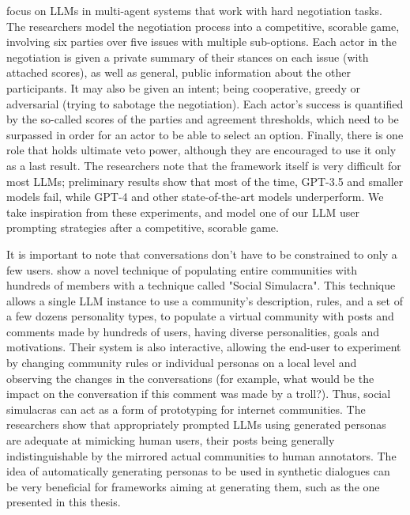 \citet{abdelnabi2024cooperationcompetitionmaliciousnessllmstakeholders} focus on LLMs in multi-agent systems that work with hard negotiation tasks. The researchers model the negotiation process into a competitive, scorable game, involving six parties over five issues with multiple sub-options. Each actor in the negotiation is given a private summary of their stances on each issue (with attached scores), as well as general, public information about the other participants. It may also be given an intent; being cooperative, greedy or adversarial (trying to sabotage the negotiation). Each actor's success is quantified by the so-called scores of the parties and agreement thresholds, which need to be surpassed in order for an actor to be able to select an option. Finally, there is one role that holds ultimate veto power, although they are encouraged to use it only as a last result. The researchers note that the framework itself is very difficult for most LLMs; preliminary results show that most of the time, GPT-3.5 and smaller models fail, while GPT-4 and other state-of-the-art models underperform. We take inspiration from these experiments, and model one of our LLM user prompting strategies after a competitive, scorable game.

It is important to note that conversations don't have to be constrained to only a few users. \citet{park2022socialsimulacracreatingpopulated} show a novel technique of populating entire communities with hundreds of members with a technique called "Social Simulacra". This technique allows a single LLM instance to use a community's description, rules, and a set of a few dozens personality types, to populate a virtual community with posts and comments made by hundreds of users, having diverse personalities, goals and motivations. Their system is also interactive, allowing the end-user to experiment by changing community rules or individual personas on a local level and observing the changes in the conversations (for example, what would be the impact on the conversation if this comment was made by a troll?). Thus, social simulacras can act as a form of prototyping for internet communities. The researchers show that appropriately prompted LLMs using generated personas are adequate at mimicking human users, their posts being generally indistinguishable by the mirrored actual communities to human annotators. The idea of automatically generating personas to be used in synthetic dialogues can be very beneficial for frameworks aiming at generating them, such as the one presented in this thesis.


